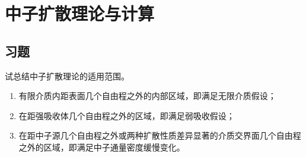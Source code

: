 \chapter{中子扩散理论与计算}
\section*{习题}

\begin{exercise}
    试总结中子扩散理论的适用范围。
    \begin{solution}
        \begin{enumerate}[(1)]
            \item 有限介质内距表面几个自由程之外的内部区域，即满足无限介质假设；
            \item 在距强吸收体几个自由程之外的区域，即满足弱吸收假设；
            \item 在距中子源几个自由程之外或两种扩散性质差异显著的介质交界面几个自由程之外的区域，即满足中子通量密度缓慢变化。
        \end{enumerate}
    \end{solution}
\end{exercise}

